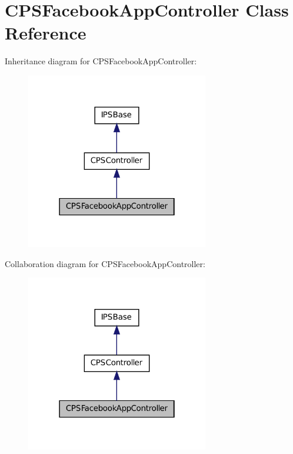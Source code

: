 \hypertarget{classCPSFacebookAppController}{
\section{CPSFacebookAppController Class Reference}
\label{classCPSFacebookAppController}
}


Inheritance diagram for CPSFacebookAppController:\nopagebreak
\begin{figure}[H]
\begin{center}
\leavevmode
\includegraphics[width=226pt]{classCPSFacebookAppController__inherit__graph}
\end{center}
\end{figure}


Collaboration diagram for CPSFacebookAppController:\nopagebreak
\begin{figure}[H]
\begin{center}
\leavevmode
\includegraphics[width=226pt]{classCPSFacebookAppController__coll__graph}
\end{center}
\end{figure}
